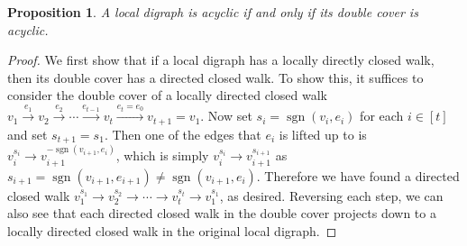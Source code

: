 \documentclass[reqno,11pt]{amsart}
\numberwithin{equation}{section}
\newtheorem{proposition}[theorem]{Proposition}
\theoremstyle{definition}
\theoremstyle{remark}
\DeclareMathOperator{\sgn}{sgn}
\begin{document}
\begin{proposition}\label{prop:ldag-double-cover}
    A local digraph is acyclic if and only if its double cover is acyclic.
\end{proposition}
\begin{proof}
    We first show that if a local digraph has a locally directly closed walk, then its double cover has a directed closed walk.
    To show this, it suffices to consider the double cover of a locally directed closed walk $v_1\xrightarrow{e_1}v_2\xrightarrow{e_2}\cdots\xrightarrow{e_{t-1}}v_t\xrightarrow{e_t=e_0}v_{t+1}=v_1$.
    Now set $s_i =  \sgn(v_i,e_i)$ for each $i\in[t]$ and set $s_{t+1}=s_1$.
    Then one of the edges that $e_i$ is lifted up to is $v_i^{s_i}\to v_{i+1}^{-\sgn(v_{i+1},e_i)}$, which is simply $v_i^{s_i}\to v_{i+1}^{s_{i+1}}$ as $s_{i+1}=\sgn(v_{i+1},e_{i+1})\neq \sgn(v_{i+1},e_i)$.
    Therefore we have found a directed closed walk $v_1^{s_1}\to v_2^{s_2}\to\cdots\to v_t^{s_t}\to v_1^{s_1}$, as desired.
    Reversing each step, we can also see that each directed closed walk in the double cover projects down to a locally directed closed walk in the original local digraph.
\end{proof}
\end{document}
